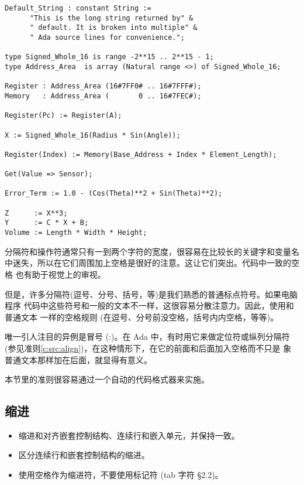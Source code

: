 \begin{blockindent}
\begin{lstlisting}
Default_String : constant String :=
      "This is the long string returned by" &
      " default. It is broken into multiple" &
      " Ada source lines for convenience.";

type Signed_Whole_16 is range -2**15 .. 2**15 - 1;
type Address_Area  is array (Natural range <>) of Signed_Whole_16;

Register : Address_Area (16#7FF0# .. 16#7FFF#);
Memory   : Address_Area (       0 .. 16#7FEC#);

Register(Pc) := Register(A);

X := Signed_Whole_16(Radius * Sin(Angle));

Register(Index) := Memory(Base_Address + Index * Element_Length);

Get(Value => Sensor);

Error_Term := 1.0 - (Cos(Theta)**2 + Sin(Theta)**2);

Z      := X**3;
Y      := C * X + B;
Volume := Length * Width * Height;
\end{lstlisting}

\end{blockindent}

\begin{blockindent}
分隔符和操作符通常只有一到两个字符的宽度，很容易在比较长的关键字和变量名
中迷失，所以在它们周围加上空格是很好的注意。这让它们突出。代码中一致的空格
也有助于视觉上的审视。

但是，许多分隔符(逗号、分号、括号，等)是我们熟悉的普通标点符号。如果电脑程序
代码中这些符号和一般的文本不一样，这很容易分散注意力。因此，使用和普通文本
一样的空格规则 (在逗号、分号前没空格，括号内内空格，等等)。

\end{blockindent}

\begin{blockindent}
唯一引人注目的异例是冒号 (:)。在 Ada 中，有时用它来做定位符或纵列分隔符
(参见准则\ref{c:src:align})，在这种情形下，在它的前面和后面加入空格而不只是
象普通文本那样加在后面，就显得有意义。
\end{blockindent}

\begin{blockindent}
本节里的准则很容易通过一个自动的代码格式器来实施。
\end{blockindent}

\subsection{缩进}
\begin{itemize}
    \item 缩进和对齐嵌套控制结构、连续行和嵌入单元，并保持一致。
    \item 区分连续行和嵌套控制结构的缩进。
    \item 使用空格作为缩进符，不要使用标记符 (tab 字符\cite{nissen84}
\S{}2.2)。
\end{itemize}

